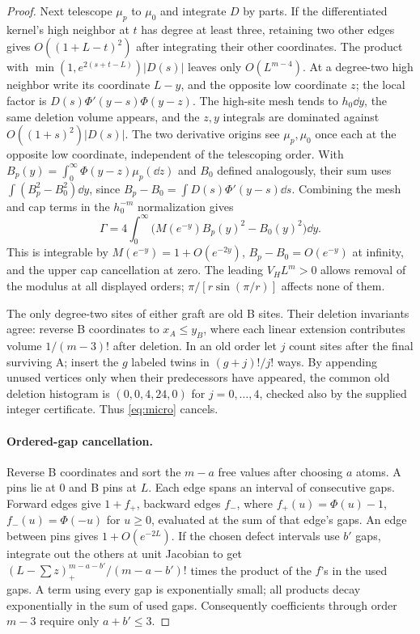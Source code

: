 \begin{proof}
Next telescope \(\mu_p\) to \(\mu_0\) and integrate \(D\) by parts. If the differentiated kernel's high neighbor at \(t\) has degree at least three, retaining two other edges gives \(O((1+L-t)^2)\) after integrating their other coordinates. The product with \(\min(1,e^{2(s+t-L)})|D(s)|\) leaves only \(O(L^{m-4})\). At a degree-two high neighbor write its coordinate \(L-y\), and the opposite low coordinate \(z\); the local factor is \(D(s)\Phi'(y-s)\Phi(y-z)\). The high-site mesh tends to \(h_0\dd y\), the same deletion volume appears, and the \(z,y\) integrals are dominated against \(O((1+s)^2)|D(s)|\). The two derivative origins see \(\mu_p,\mu_0\) once each at the opposite low coordinate, independent of the telescoping order. With \(B_p(y)=\int_0^\infty\Phi(y-z)\mu_p(\dd z)\) and \(B_0\) defined analogously, their sum uses \(\int(B_p^2-B_0^2)\dd y\), since \(B_p-B_0=\int D(s)\Phi'(y-s)\dd s\). Combining the mesh and cap terms in the \(h_0^{-m}\) normalization gives
\[
 \Gamma=4\int_0^\infty \bigl(M(e^{-y})B_p(y)^2-B_0(y)^2\bigr)\dd y.
\]
This is integrable by \(M(e^{-y})=1+O(e^{-2y})\), \(B_p-B_0=O(e^{-y})\) at infinity, and the upper cap cancellation at zero. The leading \(V_H L^m>0\) allows removal of the modulus at all displayed orders; \(\pi/[r\sin(\pi/r)]\) affects none of them.

The only degree-two sites of either graft are old B sites. Their deletion invariants agree: reverse B coordinates to \(x_A\le y_B\), where each linear extension contributes volume \(1/(m-3)!\) after deletion. In an old order let \(j\) count sites after the final surviving A; insert the \(g\) labeled twins in \((g+j)!/j!\) ways. By appending unused vertices only when their predecessors have appeared, the common old deletion histogram is \((0,0,4,24,0)\) for \(j=0,\ldots,4\), checked also by the supplied integer certificate. Thus \eqref{eq:micro} cancels.

\paragraph{Ordered-gap cancellation.}
Reverse B coordinates and sort the \(m-a\) free values after choosing \(a\) atoms. A pins lie at 0 and B pins at \(L\). Each edge spans an interval of consecutive gaps. Forward edges give \(1+f_+\), backward edges \(f_-\), where \(f_+(u)=\Phi(u)-1\), \(f_-(u)=\Phi(-u)\) for \(u\ge0\), evaluated at the sum of that edge's gaps. An edge between pins gives \(1+O(e^{-2L})\). If the chosen defect intervals use \(b'\) gaps, integrate out the others at unit Jacobian to get
\((L-\sum z)_+^{m-a-b'}/(m-a-b')!\) times the product of the \(f\)'s in the used gaps. A term using every gap is exponentially small; all products decay exponentially in the sum of used gaps. Consequently coefficients through order \(m-3\) require only \(a+b'\le3\).


\end{proof}
